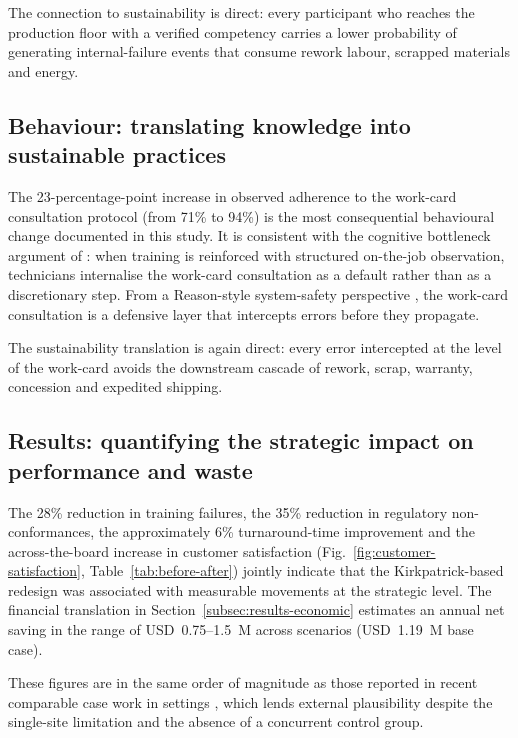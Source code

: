 The connection to sustainability is direct: every participant who reaches
the production floor with a verified competency carries a lower probability
of generating internal-failure events that consume rework labour, scrapped
materials and energy.

\subsection{Behaviour: translating knowledge into sustainable practices}
\label{subsec:disc-behaviour}

The 23-percentage-point increase in observed adherence to the work-card
consultation protocol (from 71\% to 94\%) is the most consequential
behavioural change documented in this study. It is consistent with the
cognitive bottleneck argument of \citet{Dismukes2023}: when training is
reinforced with structured on-the-job observation, technicians internalise
the work-card consultation as a default rather than as a discretionary
step. From a Reason-style system-safety perspective \citep{Reason2016,
Leveson2024}, the work-card consultation is a defensive layer that
intercepts errors before they propagate.

The sustainability translation is again direct: every error intercepted at
the level of the work-card avoids the downstream cascade of rework, scrap,
warranty, concession and expedited shipping.

\subsection{Results: quantifying the strategic impact on performance and waste}
\label{subsec:disc-results}

The 28\% reduction in training failures, the 35\% reduction in regulatory
non-conformances, the approximately 6\% turnaround-time improvement and the
across-the-board increase in customer satisfaction
(Fig.~\ref{fig:customer-satisfaction}, Table~\ref{tab:before-after}) jointly
indicate that the Kirkpatrick-based redesign was associated with measurable
movements at the strategic level. The financial translation in
Section~\ref{subsec:results-economic} estimates an annual net saving in
the range of USD~0.75--1.5~M across scenarios (USD~1.19~M base case).

These figures are in the same order of magnitude as those reported in
recent comparable case work in \MRO{} settings \citep{Zhang2025,Sousa2025},
which lends external plausibility despite the single-site limitation and
the absence of a concurrent control group.

